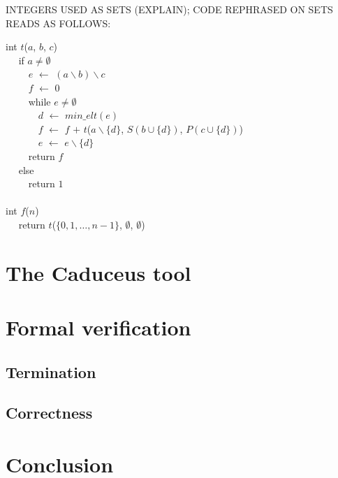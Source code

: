 \documentclass[a4paper]{llncs}
\newcommand{\kw}[1]{\textsf{#1}}
\newcommand{\minelt}[1]{\ensuremath{\mathit{min\_elt}(#1)}}
\begin{document}
INTEGERS USED AS SETS (EXPLAIN); CODE REPHRASED ON SETS READS AS FOLLOWS:

{\begin{obeylines}
  \kw{int} $t$($a$, $b$, $c$) 
  ~~ \kw{if} $a \not= \emptyset$ 
  ~~~~ $e$ $\leftarrow$ $(a \backslash  b) \backslash c$ 
  ~~~~ $f$ $\leftarrow$ 0 
  ~~~~ \kw{while} $e \not=\emptyset$ 
  ~~~~~~ $d$ $\leftarrow$ $\minelt{e}$ 
  ~~~~~~ $f$ $\leftarrow$ $f$ $+$ $t$($a\backslash \{d\}$, $S(b\cup\{d\})$, $P(c\cup\{d\})$) 
  ~~~~~~ $e$ $\leftarrow$ $e \backslash  \{d\}$ 
  ~~~~ \kw{return} $f$ 
  ~~ \kw{else} 
  ~~~~ \kw{return} $1$ 
  ~~ 
  \kw{int} $f$($n$) 
  ~~ \kw{return} $t$($\{0,1,\dots,n-1\}$, $\emptyset$, $\emptyset$)
\end{obeylines}}


\section{The Caduceus tool}\label{caduceus}

\cite{caduceus,FilliatreMarche04} \cite{why}

\cite{simplify} \cite{yices} \cite{ergo} \cite{coq}


\section{Formal verification}\label{verif}

\subsection{Termination}

\subsection{Correctness}

\section{Conclusion}

\nocite{*}


\end{document}

